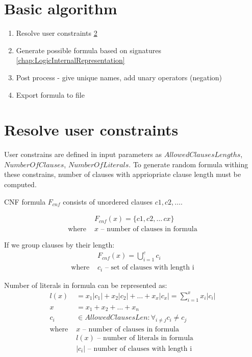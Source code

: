 \section{Basic algorithm}

\begin{enumerate}
  \item Resolve user constraints \ref{sec:ResolveUserConstrains}
  \item Generate possible formula based on signatures \ref{chap:LogicInternalRepresentation}
  \item Post process - give unique names, add unary operators (negation)
  \item Export formula to file
\end{enumerate}

\section{Resolve user constraints}
\label{sec:ResolveUserConstrains}

User constrains are defined in input parameters as $AllowedClausesLengths$, $NumberOfClauses$, $NumberOfLiterals$. To generate random formula withing these constrains, number of clauses with appriopriate clause length must be computed.

CNF formula $F_{cnf}$ consists of unordered clauses $c1, c2, \dots$. 

\begin{align*}
	&F_{cnf}(x) = \{c1, c2, \dots\, cx\} \\
	\text{where }
		&x \text{ -- number of clauses in formula}
\end{align*}

If we group clauses by their length:
\begin{align*}
	&F_{cnf}(x) = \bigcup_{i=1}^c c_i \\
	\text{where }
		&c_i \text{ -- set of clauses with length i} 
\end{align*}

Number of literals in formula can be represented as:
\begin{align*}
	l(x) &= x_1|c_1| + x_2|c_2| + \dots + x_x|c_x| = \sum_{i=1}^{x} x_i |c_i| \\
	x &= x_1 + x_2 + \dots + x_n \\
	c_i &\in AllowedClausesLen: \forall_{i \neq j} c_i \neq c_j  \\
	\text{where }
		&x \text{ -- number of clauses in formula} \\ 
		&l(x) \text{ -- number of literals in formula} \\ 
		&|c_i| \text{ -- number of clauses with length i} 
\end{align*}

